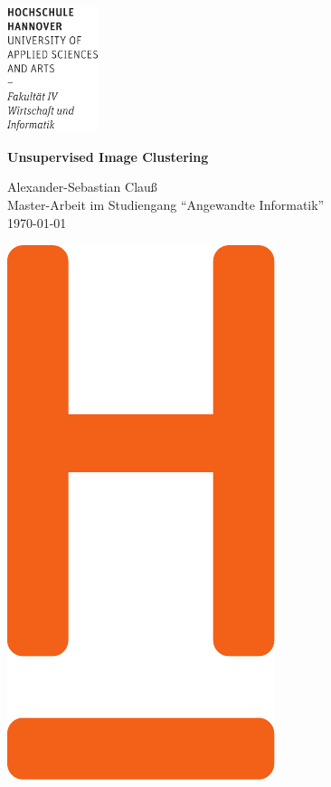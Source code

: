\documentclass[12pt,a4paper,twoside,parskip=half-,headsepline,headinclude]{scrreprt}
\begin{document}
    
  \thispagestyle{empty} %
\includegraphics[width=0.2\textwidth]{images/hsh_wortmarke.pdf}
{ \sffamily
  \vfill
  {
    \Huge\bfseries Unsupervised Image Clustering
  }
  \bigskip

  {
    \Large 
  	Alexander-Sebastian Clauß \\[2ex]
 	Master-Arbeit im Studiengang "`Angewandte Informatik"' 
    \\[5ex]
    \today 
  } 
}
\vfill
\hfill

\includegraphics[height=0.3\paperheight]{images/hsh_logo.pdf} 

\vspace*{-3cm}
\end{document}

